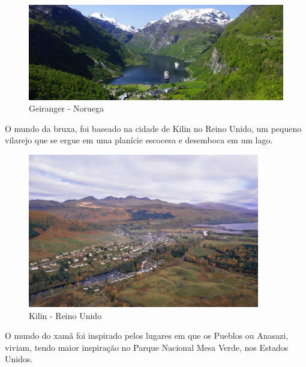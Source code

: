 \begin{figure}[htb]
    \caption{\label{fig_mundoDuende}Geiranger - Noruega}
    \begin{center}
        \includegraphics[width=\textwidth]{imagens/geiranger.jpeg}
    \end{center}
\end{figure}



O mundo da bruxa, foi baseado na cidade de Kilin no Reino Unido, um pequeno vilarejo que se ergue em uma planície escocesa e desemboca em um lago.

\begin{figure}[htb]
    \caption{\label{fig_mundoBruxa}Kilin - Reino Unido}
    \begin{center}
        \includegraphics[width=0.9\textwidth]{imagens/kilin.jpg}
    \end{center}
\end{figure}

\clearpage

O mundo do xamã foi inspirado pelos lugares em que os Pueblos ou Anasazi, viviam, tendo maior inspiração no Parque Nacional Mesa Verde, nos Estados Unidos.


